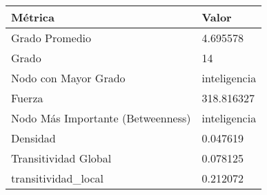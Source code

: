 \begin{tabular}{ll}
\toprule
Métrica & Valor \\
\midrule
Grado Promedio & 4.695578 \\
Grado & 14 \\
Nodo con Mayor Grado & inteligencia \\
Fuerza & 318.816327 \\
Nodo Más Importante (Betweenness) & inteligencia \\
Densidad & 0.047619 \\
Transitividad Global & 0.078125 \\
transitividad_local & 0.212072 \\
\bottomrule
\end{tabular}
